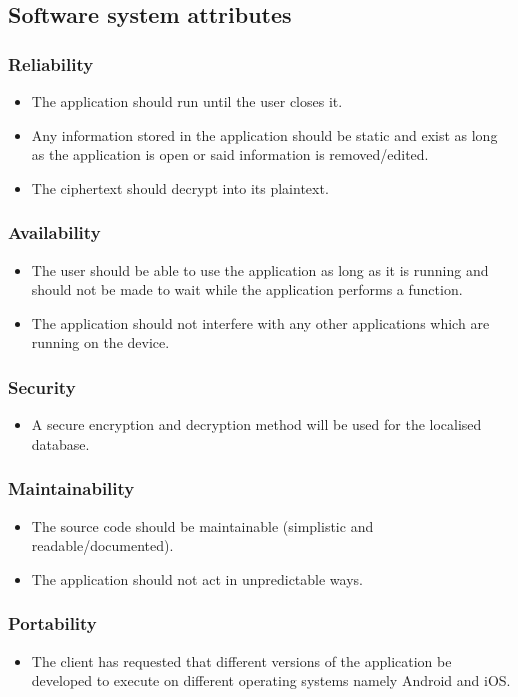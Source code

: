 \subsection{Software system attributes}
\subsubsection{Reliability}
\begin{itemize}
\item The application should run until the user closes it.
\item Any information stored in the application should be static and exist as long as the application is open or said information is removed/edited.
\item The ciphertext should decrypt into its plaintext.
\end{itemize}
\subsubsection{Availability}
\begin{itemize}
\item The user should be able to use the application as long as it is running and should not be made to wait while the application performs a function.
\item The application should not interfere with any other applications which are running on the device.
\end{itemize}
\subsubsection{Security}
\begin{itemize}
\item A secure encryption and decryption method will be used for the localised database.
\end{itemize}
\subsubsection{Maintainability}
\begin{itemize}
\item The source code should be maintainable (simplistic and readable/documented).
\item The application should not act in unpredictable ways.
\end{itemize}
\subsubsection{Portability}
\begin{itemize}
\item The client has requested that different versions of the application be developed to execute on different operating systems namely Android and iOS.
\end{itemize}
